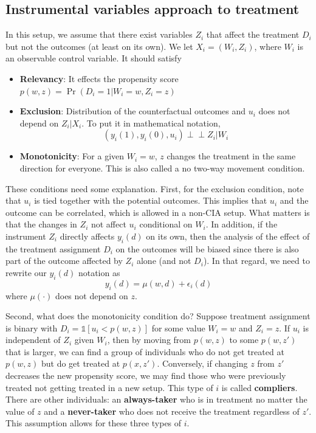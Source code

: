 \documentclass[12pt]{article}
\theoremstyle{definition}
\theoremstyle{property}
\theoremstyle{assumption}
\theoremstyle{example}
\theoremstyle{comment}
\begin{document}
\subsection{Instrumental variables approach to treatment}
In this setup, we assume that there exist variables $Z_i$ that affect the treatment $D_i$ but not the outcomes (at least on its own). We let $X_i=(W_i, Z_i)$, where $W_i$ is an observable control variable. It should satisfy
\begin{itemize}
\item \textbf{Relevancy}: It effects the propensity score $p(w,z)=\Pr(D_i=1|W_i=w, Z_i=z)$
\item \textbf{Exclusion}: Distribution of the counterfactual outcomes and $u_i$ does not depend on $Z_i|X_i$. To put it in mathematical notation, 
\[
(y_i(1), y_i(0), u_i) \perp \!\!\!\perp Z_i|W_i
\]
\item \textbf{Monotonicity}: For a given $W_i=w$, $z$ changes the treatment in the same direction for everyone. This is also called a no two-way movement condition.
\end{itemize} \par
These conditions need some explanation. First, for the exclusion condition, note that $u_i$ is tied together with the potential outcomes. This implies that $u_i$ and the outcome can be correlated, which is allowed in a non-CIA setup. What matters is that the changes in $Z_i$ not affect $u_i$ conditional on $W_i$. In addition, if the instrument $Z_i$ directly affects $y_i(d)$ on its own, then the analysis of the effect of the treatment assignment $D_i$ on the outcomes will be biased since there is also part of the outcome affected by $Z_i$ alone (and not $D_i$). In that regard, we need to rewrite our $y_i(d)$ notation as 
\[
y_i(d)=\mu(w,d)+\epsilon_i(d)
\]
where $\mu(\cdot)$ does not depend on $z$. 
\par
Second, what does the monotonicity condition do? Suppose treatment assignment is binary with $D_i=\mathbb{1}[u_i<p(w,z)]$ for some value $W_i=w$ and $Z_i=z$. If $u_i$ is independent of $Z_i$ given $W_i$, then by moving from $p(w,z)$ to some $p(w,z')$ that is larger, we can find a group of individuals who do not get treated at $p(w,z)$ but do get treated at $p(x,z')$. Conversely, if changing $z$ from $z'$ decreases the new propensity score, we may find those who were previously treated not getting treated in a new setup. This type of $i$ is called \textbf{compliers}. There are other individuals: an \textbf{always-taker} who is in treatment no matter the value of $z$ and a \textbf{never-taker} who does not receive the treatment regardless of $z'$. This assumption allows for these three types of $i$. 
\end{document}
